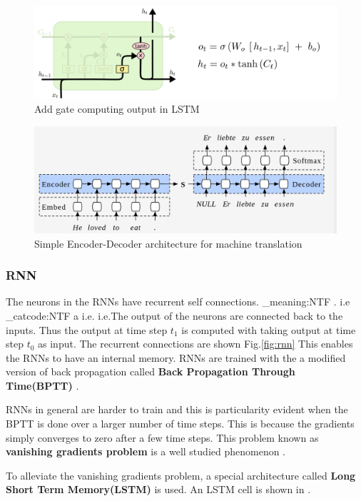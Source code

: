 \documentclass[conference]{IEEEtran}
\makeatletter
\newcommand\latinabbrev[1]{
  \peek_meaning:NTF . {%
    #1\@}%
  { \peek_catcode:NTF a {%
      #1.\@ }%
    {#1.\@}}}
\def\ie{\latinabbrev{i.e}}
\makeatother
\begin{document}
\begin{figure}
    \includegraphics[width=.99\linewidth]{img/lstm_output.png}  
    \caption{Add gate computing output in LSTM} 
    \label{fig:lstm_output}
\end{figure}

\begin{figure}
    \includegraphics[width=.99\linewidth]{img/enc_dec.png}  
    \caption{Simple Encoder-Decoder architecture for machine translation} 
    \label{fig:enc_dec}
\end{figure}


\subsubsection{RNN}
The neurons in the RNNs have recurrent self connections. \ie The output of the neurons are connected back to the inputs. Thus the output at time step $t_1$ is computed with taking output at time step $t_0$ as input. The recurrent connections are shown Fig.\ref{fig:rnn} This enables the RNNs to have an internal memory. RNNs are trained with the a modified version of back propagation called \textbf{Back Propagation Through Time(BPTT)}  \cite{werbos1990backpropagation}.

RNNs in general are harder to train and this is particularity evident when the BPTT is done over a larger number of time steps. This is because the gradients simply converges to zero after a few time steps. This problem known as \textbf{vanishing gradients problem} is a well studied phenomenon \cite{bengio1994learning}.  

To alleviate the vanishing gradients problem, a special architecture called \textbf{Long Short Term Memory(LSTM)} \cite{hochreiter1997long} is used. An LSTM cell is shown in \label{fig:lstm}.
\end{document}
